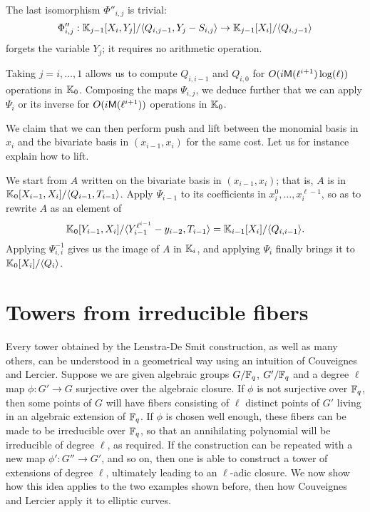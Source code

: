 \documentclass{sig-alternate}
\begin{document}
The last isomorphism $\Phi''_{i,j}$ is trivial:
$$\Phi''_{i,j}: \mathbb{K}_{j-1}[X_i, Y_j]/\langle Q_{i,j-1}, Y_j-S_{i,j}\rangle
\to \mathbb{K}_{j-1}[X_i]/\langle Q_{i,j-1}\rangle$$
forgets the variable $Y_j$; it requires no arithmetic operation.

\medskip

Taking $j=i,\dots,1$ allows us to compute $Q_{i,i-1}$ and $Q_{i,0}$
for $O(i\mathsf{M}(\ell^{i+1})\log(\ell))$ operations in $\mathbb{K}_0$. Composing
the maps $\Psi_{i,j}$, we deduce further that we can apply $\Psi_i$ or
its inverse for $O(i\mathsf{M}(\ell^{i+1}))$ operations in $\mathbb{K}_0$.  

We claim that we can then perform push and lift between the monomial
basis in $x_i$ and the bivariate basis in $(x_{i-1},x_i)$ for the same
cost. Let us for instance explain how to lift.

We start from $A$ written on the bivariate basis in $(x_{i-1},x_i)$;
that is, $A$ is in $\mathbb{K}_0[X_{i-1},X_i]/\langle Q_{i-1},
T_{i-1}\rangle$. Apply $\Psi_{i-1}$ to its coefficients in
$x_i^0,\dots,x_i^{\ell-1}$, so as to rewrite $A$ as an element of
$$\mathbb{K}_0[Y_{i-1},X_i]/\langle Y_{i-1}^{\ell^{i-1}}-y_{i-2},
T_{i-1}\rangle = \mathbb{K}_{i-1}[X_i]/\langle Q_{i,i-1} \rangle.$$ Applying
$\Psi_{i,i}^{-1}$ gives us the image of $A$ in $\mathbb{K}_i$, and applying
$\Psi_i$ finally brings it to $\mathbb{K}_0[X_i]/\langle Q_{i}\rangle$.



\section{Towers from irreducible fibers}
\label{sec:fibers}
Every tower obtained by the Lenstra-De Smit construction, as well as
many others, can be understood in a geometrical way using an intuition
of Couveignes and Lercier\cite{couveignes+lercier11}. Suppose we are
given algebraic groups $G/\mathbb{F}_q$, $G'/\mathbb{F}_q$ and a degree $\ell$ map
$\phi:G'\to G$ surjective over the algebraic closure. If $\phi$ is not
surjective over $\mathbb{F}_q$, then some points of $G$ will have fibers
consisting of $\ell$ distinct points of $G'$ living in an algebraic
extension of $\mathbb{F}_q$. If $\phi$ is chosen well enough, these fibers can
be made to be irreducible over $\mathbb{F}_q$, so that an annihilating
polynomial will be irreducible of degree $\ell$, as required. If the
construction can be repeated with a new map $\phi':G''\to G'$, and so
on, then one is able to construct a tower of extensions of degree
$\ell$, ultimately leading to an $\ell$-adic closure. We now show how
this idea applies to the two examples shown before, then how
Couveignes and Lercier apply it to elliptic curves.
\end{document}
